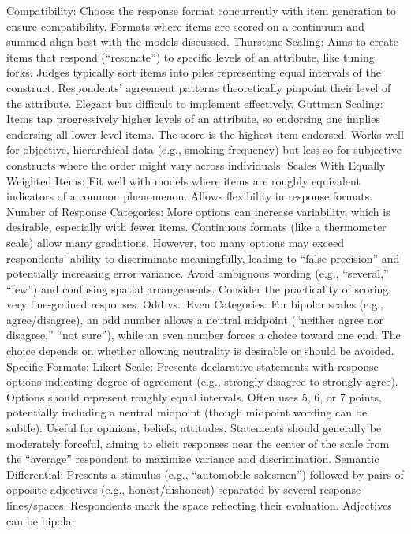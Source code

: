 \documentclass[
]{article}
\begin{document}
Compatibility: Choose the response format concurrently with item
generation to ensure compatibility. Formats where items are scored on a
continuum and summed align best with the models discussed. Thurstone
Scaling: Aims to create items that respond (``resonate'') to specific
levels of an attribute, like tuning forks. Judges typically sort items
into piles representing equal intervals of the construct. Respondents'
agreement patterns theoretically pinpoint their level of the attribute.
Elegant but difficult to implement effectively. Guttman Scaling: Items
tap progressively higher levels of an attribute, so endorsing one
implies endorsing all lower-level items. The score is the highest item
endorsed. Works well for objective, hierarchical data (e.g., smoking
frequency) but less so for subjective constructs where the order might
vary across individuals. Scales With Equally Weighted Items: Fit well
with models where items are roughly equivalent indicators of a common
phenomenon. Allows flexibility in response formats. Number of Response
Categories: More options can increase variability, which is desirable,
especially with fewer items. Continuous formats (like a thermometer
scale) allow many gradations. However, too many options may exceed
respondents' ability to discriminate meaningfully, leading to ``false
precision'' and potentially increasing error variance. Avoid ambiguous
wording (e.g., ``several,'' ``few'') and confusing spatial arrangements.
Consider the practicality of scoring very fine-grained responses. Odd
vs.~Even Categories: For bipolar scales (e.g., agree/disagree), an odd
number allows a neutral midpoint (``neither agree nor disagree,'' ``not
sure''), while an even number forces a choice toward one end. The choice
depends on whether allowing neutrality is desirable or should be
avoided. Specific Formats: Likert Scale: Presents declarative statements
with response options indicating degree of agreement (e.g., strongly
disagree to strongly agree). Options should represent roughly equal
intervals. Often uses 5, 6, or 7 points, potentially including a neutral
midpoint (though midpoint wording can be subtle). Useful for opinions,
beliefs, attitudes. Statements should generally be moderately forceful,
aiming to elicit responses near the center of the scale from the
``average'' respondent to maximize variance and discrimination. Semantic
Differential: Presents a stimulus (e.g., ``automobile salesmen'')
followed by pairs of opposite adjectives (e.g., honest/dishonest)
separated by several response lines/spaces. Respondents mark the space
reflecting their evaluation. Adjectives can be bipolar
\end{document}
